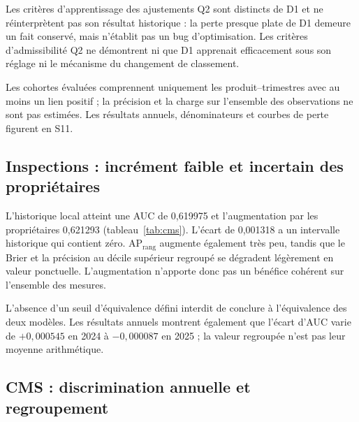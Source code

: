  
Les critères d'apprentissage des ajustements Q2 sont distincts de D1 et ne réinterprètent pas son résultat historique : la perte presque plate de D1 demeure un fait conservé, mais n'établit pas un bug d'optimisation. Les critères d'admissibilité Q2 ne démontrent ni que D1 apprenait efficacement sous son réglage ni le mécanisme du changement de classement.

Les cohortes évaluées comprennent uniquement les produit--trimestres avec au moins un lien positif ; la précision et la charge sur l'ensemble des observations ne sont pas estimées. Les résultats annuels, dénominateurs et courbes de perte figurent en S11.

\subsection{Inspections : incrément faible et incertain des propriétaires}

\begin{table}[!htbp]
\centering\small
\caption{Inspections CMS, prédictions de test 2024--2025 regroupées. $P_{10\%}$ et $R_{10\%}$ : précision et rappel au décile calculé sur les scores regroupés, non séparément par année. Le Brier doit diminuer ; les autres mesures doivent augmenter. Source : tableau unifié\cite{hgbresults}.}
\label{tab:cms}

\end{table}

L'historique local atteint une AUC de 0,619975 et l'augmentation par les propriétaires 0,621293 (tableau~\ref{tab:cms}). L'écart de 0,001318 a un intervalle historique qui contient zéro. $\mathrm{AP}_{\mathrm{rang}}$ augmente également très peu, tandis que le Brier et la précision au décile supérieur regroupé se dégradent légèrement en valeur ponctuelle. L'augmentation n'apporte donc pas un bénéfice cohérent sur l'ensemble des mesures\cite{hgbresults}.

L'absence d'un seuil d'équivalence défini interdit de conclure à l'équivalence des deux modèles. Les résultats annuels montrent également que l'écart d'AUC varie de $+0,000545$ en 2024 à $-0,000087$ en 2025 ; la valeur regroupée n'est pas leur moyenne arithmétique\cite{hgbresults}.


\subsection{CMS : discrimination annuelle et regroupement}
\label{sec:cmsannual}

\begin{table}[!htbp]
\centering\footnotesize
\caption{CMS : résultats de test par année, transcrits de l'analyse gelée. Les prévalences sont 14,0644\,\% en 2024 et 11,6118\,\% en 2025. L'AP utilise la convention de rang du code. Le supplément inclut la validation 2023\cite{hgbanalysis}.}
\label{tab:cmsannual}

\end{table}

